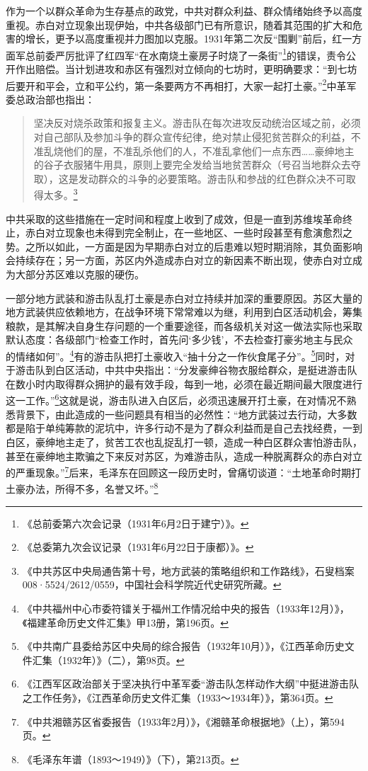 作为一个以群众革命为生存基点的政党，中共对群众利益、群众情绪始终予以高度重视。赤白对立现象出现伊始，中共各级部门已有所意识，随着其范围的扩大和危害的增长，更予以高度重视并力图加以克服。1931年第二次反“围剿”前后，红一方面军总前委严厉批评了红四军“在水南烧土豪房子时烧了一条街”\footnote{《总前委第六次会记录（1931年6月2日于建宁）》。}的错误，责令公开作出赔偿。当计划进攻和赤区有强烈对立倾向的七坊时，更明确要求：“到七坊后要开和平会，立和平公约，第一条要两方不再相打，大家一起打土豪。”\footnote{《总委第九次会议记录（1931年6月22日于康都）》。}中革军委总政治部也指出：

\begin{quote}

坚决反对烧杀政策和报复主义。游击队在每次进攻反动统治区域之前，必须对自己部队及参加斗争的群众宣传纪律，绝对禁止侵犯贫苦群众的利益，不准乱烧他们的屋，不准乱杀他们的人，不准乱拿他们一点东西……豪绅地主的谷子衣服猪牛用具，原则上要完全发给当地贫苦群众（号召当地群众去夺取），这是发动群众的斗争的必要策略。游击队和参战的红色群众决不可取得太多。\footnote{《中共苏区中央局通告第十号，地方武装的策略组织和工作路线》，石叟档案008·5524/2612/0559，中国社会科学院近代史研究所藏。}
\end{quote}


中共采取的这些措施在一定时间和程度上收到了成效，但是一直到苏维埃革命终止，赤白对立现象也未得到完全制止，在一些地区、一些时段甚至有愈演愈烈之势。之所以如此，一方面是因为早期赤白对立的后患难以短时期消除，其负面影响会持续存在；另一方面，苏区内外造成赤白对立的新因素不断出现，使赤白对立成为大部分苏区难以克服的硬伤。


一部分地方武装和游击队乱打土豪是赤白对立持续并加深的重要原因。苏区大量的地方武装供应依赖地方，在战争环境下常常难以为继，利用到白区活动机会，筹集粮款，是其解决自身生存问题的一个重要途径，而各级机关对这一做法实际也采取默认态度：各级部门“检查工作时，首先问‘多少钱’，不去检查打豪劣地主与民众的情绪如何”。\footnote{《中共福州中心市委符镭关于福州工作情况给中央的报告（1933年12月）》，《福建革命历史文件汇集》甲13册，第196页。}有的游击队把打土豪收入“抽十分之一作伙食尾子分”。\footnote{《中共南广县委给苏区中央局的综合报告（1932年10月）》，《江西革命历史文件汇集（1932年）》（二），第98页。}同时，对于游击队到白区活动，中共中央指出：“分发豪绅谷物衣服给群众，是挺进游击队在数小时内取得群众拥护的最有效手段，每到一地，必须在最近期间最大限度进行这一工作。”\footnote{《江西军区政治部关于坚决执行中革军委“游击队怎样动作大纲”中挺进游击队之工作任务》，《江西革命历史文件汇集（1933～1934年）》，第364页。}这就是说，游击队进入白区后，必须迅速展开打土豪，在对情况不熟悉背景下，由此造成的一些问题具有相当的必然性：“地方武装过去行动，大多数都是陷于单纯筹款的泥坑中，许多行动不是为了群众利益而是自己去找经费，一到白区，豪绅地主走了，贫苦工农也乱捉乱打一顿，造成一种白区群众害怕游击队，甚至在豪绅地主欺骗之下来反对苏区，为难游击队，造成一种脱离群众的赤白对立的严重现象。”\footnote{《中共湘赣苏区省委报告（1933年2月）》，《湘赣革命根据地》（上），第594页。}后来，毛泽东在回顾这一段历史时，曾痛切谈道：“土地革命时期打土豪办法，所得不多，名誉又坏。”\footnote{《毛泽东年谱（1893～1949）》（下），第213页。}


